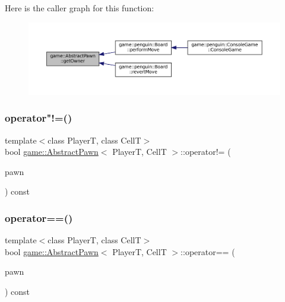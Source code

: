 Here is the caller graph for this function\+:
\nopagebreak
\begin{figure}[H]
\begin{center}
\leavevmode
\includegraphics[width=350pt]{classgame_1_1_abstract_pawn_aac49fdd8bd4aa4386fd47d3f6993b8df_icgraph}
\end{center}
\end{figure}
\mbox{\label{classgame_1_1_abstract_pawn_a8c5ef6187be3592d15ba9cf6a433c91c}} 
\subsubsection{\texorpdfstring{operator"!=()}{operator!=()}}
{\footnotesize\ttfamily template$<$class PlayerT, class CellT$>$ \\
bool \hyperlink{classgame_1_1_abstract_pawn}{game\+::\+Abstract\+Pawn}$<$ PlayerT, CellT $>$\+::operator!= (\begin{DoxyParamCaption}\item[{const \hyperlink{classgame_1_1_abstract_pawn}{Abstract\+Pawn}$<$ PlayerT, CellT $>$ \&}]{pawn }\end{DoxyParamCaption}) const\hspace{0.3cm}{\ttfamily [inline]}}

\mbox{\label{classgame_1_1_abstract_pawn_a65dada55fadc0df1169d8a6b0661c05a}} 
\subsubsection{\texorpdfstring{operator==()}{operator==()}}
{\footnotesize\ttfamily template$<$class PlayerT, class CellT$>$ \\
bool \hyperlink{classgame_1_1_abstract_pawn}{game\+::\+Abstract\+Pawn}$<$ PlayerT, CellT $>$\+::operator== (\begin{DoxyParamCaption}\item[{const \hyperlink{classgame_1_1_abstract_pawn}{Abstract\+Pawn}$<$ PlayerT, CellT $>$ \&}]{pawn }\end{DoxyParamCaption}) const\hspace{0.3cm}{\ttfamily [inline]}}

